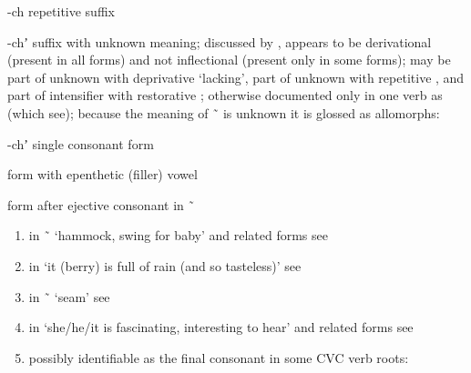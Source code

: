 \begin{morphdesc}[resume*=alphalist]
\item[-ch]\label{m:-ch}
	repetitive suffix

\item[-chʼ]\label{m:-chʼ}
	suffix with unknown meaning;
	discussed by \textcite[56]{story:1966},
		appears to be derivational (present in all forms)
		and not inflectional (present only in some forms);
	may be part of unknown  with deprivative  ‘lacking’,
		part of unknown  with repetitive ,
		and part of intensifier  with restorative ;
	otherwise documented only in one verb as  (which see);
	because the meaning of  \~\  is unknown it is glossed as 
	\newline
	allomorphs:
	\begin{allolist}
	\item[-chʼ]	single consonant form
	\item[\X{-áchʼ}]	form with epenthetic (filler) vowel 
	\item[\X{-sh}]	form after ejective consonant in  \~\ 
	\end{allolist}
	\begin{enumerate}
	\item	in  \~\  ‘hammock, swing for baby’
		and related forms
		see 
	\item	in  ‘it (berry) is full of rain (and so tasteless)’
		see 
	\item	in  \~\  ‘seam’
		see 
	\item	in  ‘she/he/it is fascinating, interesting to hear’
		and related forms
		see 
	\item	possibly identifiable as the final consonant in some CVC verb roots:
\end{enumerate}
\end{morphdesc}

